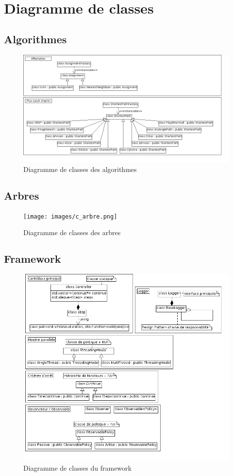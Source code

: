 \section{Diagramme de classes}
\subsection{Algorithmes}
\begin{figure}[!h]\centering
   \includegraphics[scale=0.5]{images/c_algo.png}
   \caption{\label{c_algo} Diagramme de classes des algorithmes}
\end{figure}

\subsection{Arbres}
\begin{figure}[!h]\centering
   \texttt{[image: images/c\_arbre.png]}
   \caption{\label{c_arbre} Diagramme de classes des arbres}
\end{figure}

\subsection{Framework}
\begin{figure}[!h]\centering
   \includegraphics[scale=0.5]{images/c_framework.png}
   \caption{\label{c_framework} Diagramme de classes du framework}
\end{figure}

